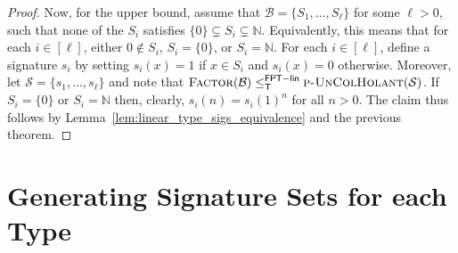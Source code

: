 \documentclass[authorcolumns,numberwithinsect]{no-lipics-v2022}
\newcommand{\fptlinred}{\leq^{\mathsf{FPT-lin}}_{\mathsf{T}}}
\begin{document}
\begin{proof}
Now, for the upper bound, assume that $\mathcal{B}=\{S_1,\dots,S_\ell\}$ for some $\ell>0$, such that none of the $S_i$ satisfies $\{0\}\subsetneq S_i \subsetneq \mathbb{N}$. Equivalently, this means that for each $i\in[\ell]$, either $0\notin S_i$, $S_i=\{0\}$, or $S_i=\mathbb{N}$. For each $i\in [\ell]$, define a signature $s_i$ by setting $s_i(x)=1$ if $x\in S_i$ and $s_i(x)=0$ otherwise. Moreover, let $\mathcal{S}=\{s_1,\dots,s_\ell\}$ and note that $\textsc{Factor}(\mathcal{B}) \fptlinred \textsc{p-UnColHolant}(\mathcal{S})$. If $S_i=\{0\}$ or $S_i=\mathbb{N}$ then, clearly, $s_i(n)=s_i(1)^n$ for all $n>0$. The claim thus follows by Lemma~\ref{lem:linear_type_sigs_equivalence} and the previous theorem.
\end{proof}




\newpage

\appendix

\section{Generating Signature Sets for each Type}
\end{document}

